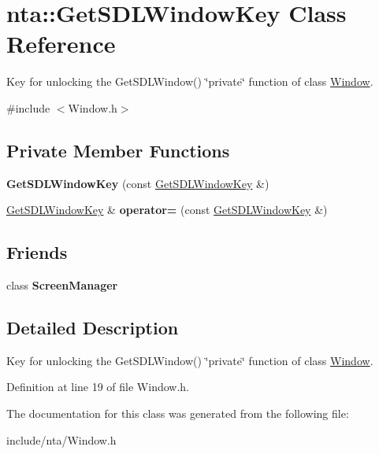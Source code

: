 \hypertarget{classnta_1_1GetSDLWindowKey}{}\section{nta\+:\+:Get\+S\+D\+L\+Window\+Key Class Reference}
\label{classnta_1_1GetSDLWindowKey}


Key for unlocking the Get\+S\+D\+L\+Window() \char`\"{}private\char`\"{} function of class \hyperlink{classnta_1_1Window}{Window}.  




{\ttfamily \#include $<$Window.\+h$>$}

\subsection*{Private Member Functions}
\begin{DoxyCompactItemize}
\item 
\mbox{\label{classnta_1_1GetSDLWindowKey_ae963466e80c61d0409855144ad8096e1}} 
{\bfseries Get\+S\+D\+L\+Window\+Key} (const \hyperlink{classnta_1_1GetSDLWindowKey}{Get\+S\+D\+L\+Window\+Key} \&)
\item 
\mbox{\label{classnta_1_1GetSDLWindowKey_a9753a4f5a30517dce3219a8877fe7cd8}} 
\hyperlink{classnta_1_1GetSDLWindowKey}{Get\+S\+D\+L\+Window\+Key} \& {\bfseries operator=} (const \hyperlink{classnta_1_1GetSDLWindowKey}{Get\+S\+D\+L\+Window\+Key} \&)
\end{DoxyCompactItemize}
\subsection*{Friends}
\begin{DoxyCompactItemize}
\item 
\mbox{\label{classnta_1_1GetSDLWindowKey_a888edc649fed896d28811ec69f3f2066}} 
class {\bfseries Screen\+Manager}
\end{DoxyCompactItemize}


\subsection{Detailed Description}
Key for unlocking the Get\+S\+D\+L\+Window() \char`\"{}private\char`\"{} function of class \hyperlink{classnta_1_1Window}{Window}. 

Definition at line 19 of file Window.\+h.



The documentation for this class was generated from the following file\+:\begin{DoxyCompactItemize}
\item 
include/nta/Window.\+h\end{DoxyCompactItemize}
